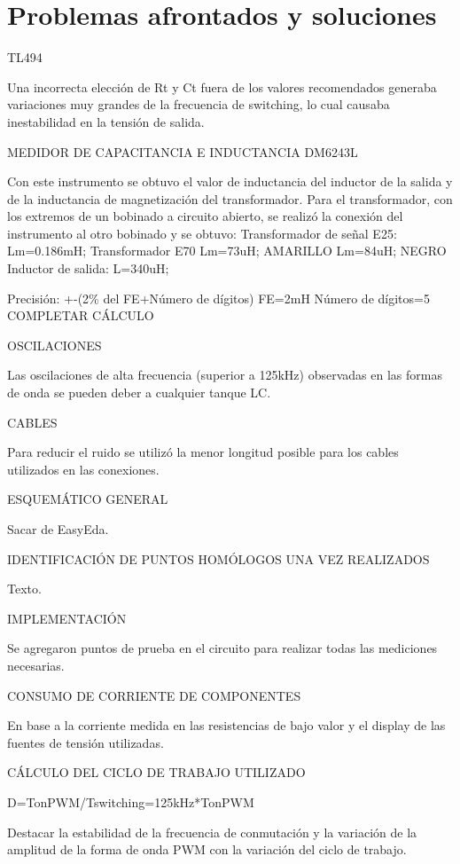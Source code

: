 \section{Problemas afrontados y soluciones}

TL494

Una incorrecta elección de Rt y Ct fuera de los valores recomendados generaba variaciones muy grandes de la frecuencia de switching, 
lo cual causaba inestabilidad en la tensión de salida. 

MEDIDOR DE CAPACITANCIA E INDUCTANCIA DM6243L

Con este instrumento se obtuvo el valor de inductancia del inductor de la salida y de la inductancia de magnetización del transformador. 
Para el transformador, con los extremos de un bobinado a circuito abierto, se realizó la conexión del instrumento al otro bobinado y se obtuvo:
Transformador de señal E25:
Lm=0.186mH; 
Transformador E70
Lm=73uH; AMARILLO 
Lm=84uH; NEGRO
Inductor de salida:
L=340uH;

Precisión: +-(2\% del FE+Número de dígitos)
FE=2mH
Número de dígitos=5
COMPLETAR CÁLCULO 

OSCILACIONES

Las oscilaciones de alta frecuencia (superior a 125kHz) observadas en las formas de onda se pueden deber a cualquier tanque LC. 

CABLES

Para reducir el ruido se utilizó la menor longitud posible para los cables utilizados en las conexiones. 

ESQUEMÁTICO GENERAL 

Sacar de EasyEda. 

IDENTIFICACIÓN DE PUNTOS HOMÓLOGOS UNA VEZ REALIZADOS 

Texto.

IMPLEMENTACIÓN

Se agregaron puntos de prueba en el circuito para realizar todas las mediciones necesarias. 

CONSUMO DE CORRIENTE DE COMPONENTES 

En base a la corriente medida en las resistencias de bajo valor y el display de las fuentes de tensión utilizadas. 

CÁLCULO DEL CICLO DE TRABAJO UTILIZADO 

D=TonPWM/Tswitching=125kHz*TonPWM

Destacar la estabilidad de la frecuencia de conmutación y la variación de la amplitud de la forma de onda PWM con la variación del ciclo de trabajo. 

